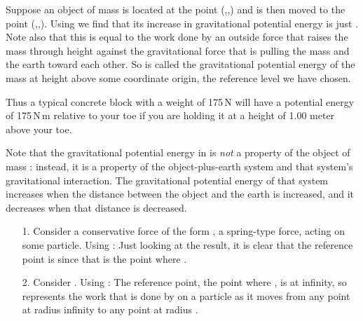 {Suppose an object of mass  is located at the point (,,) and
is then moved to the point (,,).
Using  we find that its increase in gravitational potential
energy is just .
Note also that this is equal to the work done by an outside force
 that raises the mass  through height  against
the gravitational force that is pulling the mass and the earth toward each
other.
So  is called the gravitational potential energy of the mass  at
height  above some coordinate origin, the reference level we have chosen.

Thus a typical concrete block with a weight of 175\,N will have a potential
energy of 175\,N\,m relative to your toe if you are holding it at a height of
1.00 meter above your toe.

Note that the gravitational potential energy in  is \textit{not}
a property of the object of mass : instead, it is a property of the
object-plus-earth system and that system's gravitational interaction.
The gravitational potential energy of that system increases when the distance
between the object and the earth is increased, and it decreases when that
distance is decreased.

\begin{itemize}
\item [1.] Consider a conservative force of the form , a
spring-type force, acting on some particle.
Using :
%
%
Just looking at the result, it is clear that the reference point is 
since that is the point where .

\item [2.] Consider .
Using :
%
%
The reference point, the point where , is at infinity, so 
represents the work that is done by  on a particle as it moves from
any point at radius infinity to any point at radius .
\end{itemize}
}%
%
